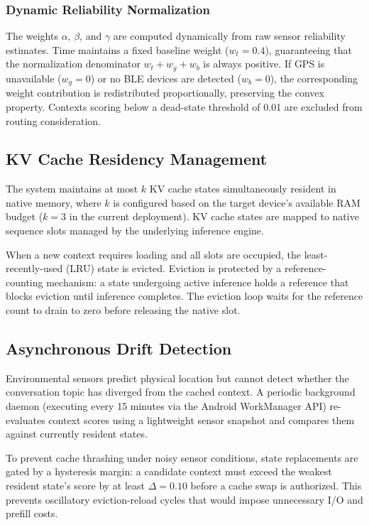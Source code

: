 \subsubsection{Dynamic Reliability Normalization}
The weights $\alpha$, $\beta$, and $\gamma$ are computed dynamically from raw sensor reliability estimates. Time maintains a fixed baseline weight ($w_t = 0.4$), guaranteeing that the normalization denominator $w_t + w_g + w_b$ is always positive. If GPS is unavailable ($w_g = 0$) or no BLE devices are detected ($w_b = 0$), the corresponding weight contribution is redistributed proportionally, preserving the convex property. Contexts scoring below a dead-state threshold of 0.01 are excluded from routing consideration.

\subsection{KV Cache Residency Management}
\label{sec:residency}

The system maintains at most $k$ KV cache states simultaneously resident in native memory, where $k$ is configured based on the target device's available RAM budget ($k = 3$ in the current deployment). KV cache states are mapped to native sequence slots managed by the underlying inference engine.

When a new context requires loading and all slots are occupied, the least-recently-used (LRU) state is evicted. Eviction is protected by a reference-counting mechanism: a state undergoing active inference holds a reference that blocks eviction until inference completes. The eviction loop waits for the reference count to drain to zero before releasing the native slot.

\subsection{Asynchronous Drift Detection}
\label{sec:drift}

Environmental sensors predict physical location but cannot detect whether the conversation topic has diverged from the cached context. A periodic background daemon (executing every 15 minutes via the Android WorkManager API) re-evaluates context scores using a lightweight sensor snapshot and compares them against currently resident states.

To prevent cache thrashing under noisy sensor conditions, state replacements are gated by a hysteresis margin: a candidate context must exceed the weakest resident state's score by at least $\Delta = 0.10$ before a cache swap is authorized. This prevents oscillatory eviction-reload cycles that would impose unnecessary I/O and prefill costs.

